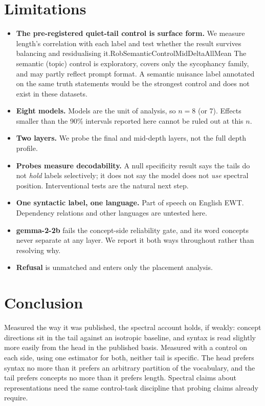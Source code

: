 \documentclass[11pt]{report}
\newcommand{\ifsemantic}[1]{\ifcsname RobSemanticControlMidDeltaAllMean\endcsname #1\fi}
\begin{document}
\chapter{Limitations}
\begin{itemize}
  \item \textbf{The pre-registered quiet-tail control is surface form.} We
        measure length's correlation with each label and test whether the result
        survives balancing and residualising it.\ifsemantic{ The semantic
        (topic) control is exploratory, covers only the sycophancy family, and
        may partly reflect prompt format.} A semantic nuisance label annotated on
        the same truth statements would be the strongest control and does not
        exist in these datasets.
  \item \textbf{Eight models.} Models are the unit of analysis, so $n=8$ (or 7).
        Effects smaller than the 90\% intervals reported here
        cannot be ruled out at this $n$.
  \item \textbf{Two layers.} We probe the final and mid-depth layers, not the
        full depth profile.
  \item \textbf{Probes measure decodability.} A null specificity result says the
        tails do not \emph{hold} labels selectively; it does not say the model
        does not \emph{use} spectral position. Interventional tests
        \citep{elazar2021amnesic,belrose2023leace} are the natural next step.
  \item \textbf{One syntactic label, one language.} Part of speech on English
        EWT. Dependency relations and other languages are untested here.
  \item \textbf{gemma-2-2b} fails the concept-side reliability gate, and its
        word concepts never separate at any layer. We report it both ways
        throughout rather than resolving why.
  \item \textbf{Refusal} is unmatched and enters only the placement analysis.
\end{itemize}

\chapter{Conclusion}
Measured the way it was published, the spectral account holds, if weakly:
concept directions sit in the tail against an isotropic baseline, and syntax is
read slightly more easily from the head in the published basis.
Measured with a control on each side, using one estimator for both, neither
tail is specific. The head prefers syntax no more than it prefers an arbitrary
partition of the vocabulary, and the tail prefers concepts no more than it
prefers length. Spectral claims about representations need the same control-task
discipline that probing claims already require.
\end{document}

